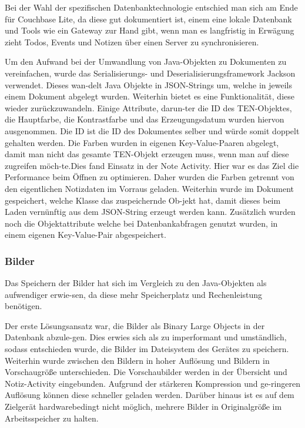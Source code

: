 Bei der Wahl der spezifischen Datenbanktechnologie entschied man sich am Ende für Couchbase Lite, da diese gut dokumentiert ist, einem eine lokale Datenbank und Tools wie ein Gateway zur Hand gibt, wenn man es langfristig in Erwägung zieht Todos, Events und Notizen über einen Server zu synchronisieren.

Um den Aufwand bei der Umwandlung von Java-Objekten zu Dokumenten zu vereinfachen, wurde das Serialisierungs- und Deserialisierungsframework Jackson verwendet. Dieses wan-delt Java Objekte in JSON-Strings um, welche in jeweils einem Dokument abgelegt wurden. Weiterhin bietet es eine Funktionalität, diese wieder zurückzuwandeln. Einige Attribute, darun-ter die ID des TEN-Objektes, die Hauptfarbe, die Kontrastfarbe und das Erzeugungsdatum wurden hiervon ausgenommen. Die ID ist die ID des Dokumentes selber und würde somit doppelt gehalten werden. Die Farben wurden in eigenen Key-Value-Paaren abgelegt, damit man nicht das gesamte TEN-Objekt erzeugen muss, wenn man auf diese zugreifen möch-te.Dies fand Einsatz in der Note Activity. Hier war es das Ziel die Performance beim Öffnen zu optimieren. Daher wurden die Farben getrennt von den eigentlichen Notizdaten im Vorraus geladen. Weiterhin wurde im Dokument gespeichert, welche Klasse das zuspeichernde Ob-jekt hat, damit dieses beim Laden vernünftig aus dem JSON-String erzeugt werden kann. Zusätzlich wurden noch die Objektattribute welche bei Datenbankabfragen genutzt wurden, in einem eigenen Key-Value-Pair abgespeichert.

\subsubsection{Bilder}
Das Speichern der Bilder hat sich im Vergleich zu den Java-Objekten als aufwendiger erwie-sen, da diese mehr Speicherplatz und Rechenleistung benötigen.

Der erste Lösungsansatz war, die Bilder als Binary Large Objects in der Datenbank abzule-gen. Dies erwies sich als zu imperformant und umständlich, sodass entschieden wurde, die Bilder im Dateisystem des Gerätes zu speichern. Weiterhin wurde zwischen den Bildern in hoher Auflösung und Bildern in Vorschaugröße unterschieden. Die Vorschaubilder werden in der Übersicht und Notiz-Activity eingebunden. Aufgrund der stärkeren Kompression und ge-ringeren Auflösung können diese schneller geladen werden. Darüber hinaus ist es auf dem Zielgerät hardwarebedingt nicht möglich, mehrere Bilder in Originalgröße im Arbeitsspeicher zu halten.

